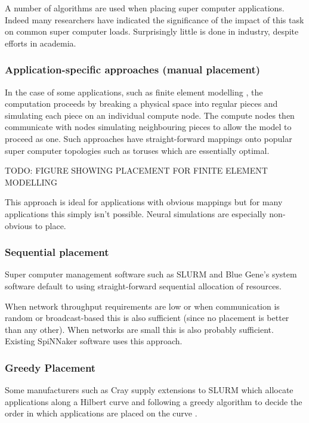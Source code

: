 			A number of algorithms are used when placing super computer applications.
			Indeed many researchers have indicated the significance of the impact of
			this task on common super computer loads. Surprisingly little is done in
			industry, despite efforts in academia.
			
			\subsubsection{Application-specific approaches (manual placement)}
				
				In the case of some applications, such as finite element modelling
				\cite{clausen10}, the computation proceeds by breaking a physical space
				into regular pieces and simulating each piece on an individual compute
				node. The compute nodes then communicate with nodes simulating
				neighbouring pieces to allow the model to proceed as one. Such
				approaches have straight-forward mappings onto popular super computer
				topologies such as toruses which are essentially optimal.
				
				TODO: FIGURE SHOWING PLACEMENT FOR FINITE ELEMENT MODELLING
				
				This approach is ideal for applications with obvious mappings but for
				many applications this simply isn't possible. Neural simulations are
				especially non-obvious to place.
			
			\subsubsection{Sequential placement}
				
				Super computer management software such as SLURM \cite{yoo03} and Blue
				Gene's system software \cite{gilge14} default to using straight-forward
				sequential allocation of resources.
				
				When
				network throughput requirements are low or when communication is random
				or broadcast-based this is also sufficient (since no placement is
				better than any other). When networks are small this is also probably
				sufficient. Existing SpiNNaker software uses this approach.
			
			\subsubsection{Greedy Placement}
				
				Some manufacturers such as Cray supply extensions to SLURM which
				allocate applications along a Hilbert curve and following a greedy
				algorithm to decide the order in which applications are placed on the
				curve \cite{yoo03}.
				
